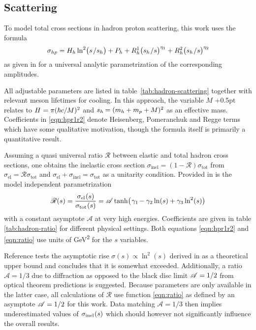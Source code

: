 \subsection*{Scattering}

To model total cross sections in hadron proton scattering, this work uses the formula
\begin{equation}
	\sigma_{hp} = H_h \ln^2 \bigl( s \kern+1.0pt / s_h \bigr) + P_h +
	R_h^1 \bigl( s_h \kern+0.5pt / s \bigr)^{\eta_1} + R_h^2 \bigl( s_h \kern+0.5pt / s \bigr)^{\eta_2}
	\label{eqn:hpr1r2}
\end{equation}
as given in \cite{Belousov_2016} for a universal analytic parametrization of the corresponding amplitudes.

All adjustable parameters are listed in table~\ref{tab:hadron-scattering} together with relevant meson lifetimes for
cooling. In this approach, the variable $M$ \kern+0.5pt relates to $H \kern+0.5pt = \pi (\hbar c / M)^2$ and
$s_h \kern-0.5pt = (m_h + m_p + M)^2$ as an effective mass. Coefficients in \eqref{eqn:hpr1r2} denote Heisenberg,
Pomeranchuk and Regge terms which have some qualitative motivation, though the formula itself is primarily a quantitative
result.



Assuming a quasi universal ratio $\mathscr{R}$ between elastic and total hadron cross sections, one obtains the inelastic
cross section $\sigma_\text{inel} = (1 - \mathscr{R}) \sigma_\text{tot}$ from $\sigma_\text{el} = \mathscr{R} \sigma_\text{tot}$
and $\sigma_\text{el} + \sigma_\text{inel} = \sigma_\text{tot}$ as a unitarity condition. Provided in \cite{Fagundes_2012} is
the model independent parametrization
\begin{equation}
	\mathscr{R}(s) = \frac{\sigma_{\text{el}\kern+0.5pt} (s)}{\sigma_{\text{tot}\kern+0.5pt} (s)} =
	\mathscr{A} \tanh \bigl( \kern+1.0pt \gamma_1 \kern-1.0pt - \gamma_2 \ln (s) + \gamma_3 \ln^2 (s) \bigr)
	\label{eqn:ratio}
\end{equation}
with a constant asymptote $\mathscr{A}$ at very high energies. Coefficients are given in table \ref{tab:hadron-ratio} for
different physical settings. Both equations \eqref{eqn:hpr1r2} and \eqref{eqn:ratio} use units of \unit{\giga\electronvolt\squared}
for the $s$  variables.



Reference \cite{Fagundes_2013} tests the asymptotic rise $\sigma(s) \propto \ln^2(s)$ derived in \cite{Froissart_1961} as
a theoretical upper bound and concludes that it is somewhat exceeded. Additionally, a ratio $\mathscr{A} = 1/3$ due to
diffraction as opposed to the black disc limit $\mathscr{A} = 1/2 \kern+0.2pt$ from optical theorem predictions is suggested.
Because parameters are only available in the latter case, all calculations of $\mathscr{R}$ use function \eqref{eqn:ratio}
as defined by an asymptote $\mathscr{A} = 1/2 \kern+0.2pt$ for this work. Data matching $\mathscr{A} = 1/3$ then implies
underestimated values of $\sigma_{\text{inel}\kern+0.5pt}(s)$ which should however not significantly influence the overall results.



